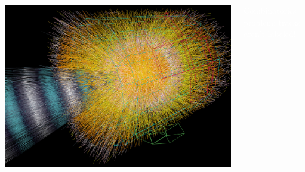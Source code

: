 \documentclass[aspectratio=169]{beamer}
\begin{document}
\begin{frame}{}
\Large
\begin{columns}
\vspace{-0.5 cm}
\includegraphics[width=\linewidth]{img/090324_ALICE-hirez.jpg}

\vspace{-11 cm}
\textcolor{white}{\hspace{0.25 cm} Combinatorics problem: tracks aren't labeled!}

\vspace{11 cm}
\end{columns}
\end{frame}
\end{document}
